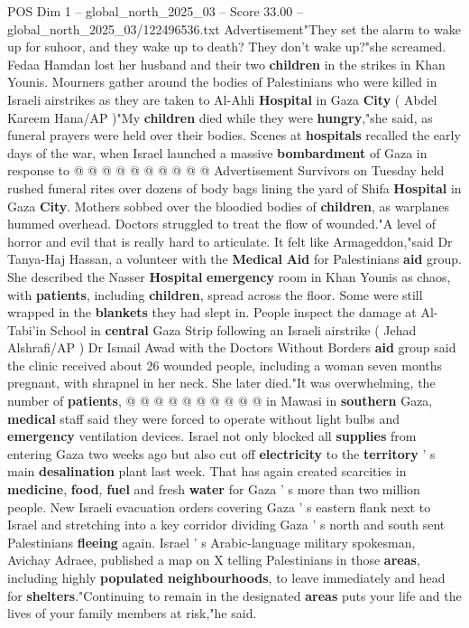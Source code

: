 \begin{textsample}{POS Dim 1 – global\_north\_2025\_03 – Score 33.00 – global\_north\_2025\_03/122496536.txt}
Advertisement"They set the alarm to wake up for suhoor, and they wake up to death?
They don't wake up?"she screamed.
Fedaa Hamdan lost her husband and their two \textbf{children} in the strikes in Khan Younis.
Mourners gather around the bodies of Palestinians who were killed in Israeli airstrikes as they are taken to Al-Ahli \textbf{Hospital} in Gaza \textbf{City} ( Abdel Kareem Hana/AP )"My \textbf{children} died while they were \textbf{hungry},"she said, as funeral prayers were held over their bodies.
Scenes at \textbf{hospitals} recalled the early days of the war, when Israel launched a massive \textbf{bombardment} of Gaza in response to @ @ @ @ @ @ @ @ @ @ Advertisement Survivors on Tuesday held rushed funeral rites over dozens of body bags lining the yard of Shifa \textbf{Hospital} in Gaza \textbf{City}.
Mothers sobbed over the bloodied bodies of \textbf{children}, as warplanes hummed overhead.
Doctors struggled to treat the flow of wounded."A level of horror and evil that is really hard to articulate.
It felt like Armageddon,"said Dr Tanya-Haj Hassan, a volunteer with the \textbf{Medical} \textbf{Aid} for Palestinians \textbf{aid} group.
She described the Nasser \textbf{Hospital} \textbf{emergency} room in Khan Younis as chaos, with \textbf{patients}, including \textbf{children}, spread across the floor.
Some were still wrapped in the \textbf{blankets} they had slept in.
People inspect the damage at Al-Tabi'in School in \textbf{central} Gaza Strip following an Israeli airstrike ( Jehad Alshrafi/AP ) Dr Ismail Awad with the Doctors Without Borders \textbf{aid} group said the clinic received about 26 wounded people, including a woman seven months pregnant, with shrapnel in her neck.
She later died."It was overwhelming, the number of \textbf{patients}, @ @ @ @ @ @ @ @ @ @ in Mawasi in \textbf{southern} Gaza, \textbf{medical} staff said they were forced to operate without light bulbs and \textbf{emergency} ventilation devices.
Israel not only blocked all \textbf{supplies} from entering Gaza two weeks ago but also cut off \textbf{electricity} to the \textbf{territory} ' s main \textbf{desalination} plant last week.
That has again created scarcities in \textbf{medicine}, \textbf{food}, \textbf{fuel} and fresh \textbf{water} for Gaza ' s more than two million people.
New Israeli evacuation orders covering Gaza ' s eastern flank next to Israel and stretching into a key corridor dividing Gaza ' s north and south sent Palestinians \textbf{fleeing} again.
Israel ' s Arabic-language military spokesman, Avichay Adraee, published a map on X telling Palestinians in those \textbf{areas}, including highly \textbf{populated} \textbf{neighbourhoods}, to leave immediately and head for \textbf{shelters}."Continuing to remain in the designated \textbf{areas} puts your life and the lives of your family members at risk,"he said.

\end{textsample}
